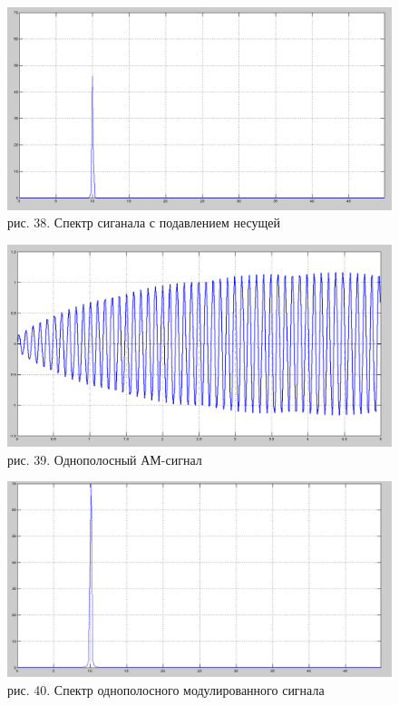 \documentclass[10pt,a4paper]{report}
\begin{document}
\begin{figure}
\begin{center}
\includegraphics[width=150mm, scale = 0.9]{7_10.png}\newline
рис. 38. Спектр сиганала с подавлением несущей \newline
\end{center}
\end{figure}
\begin{figure}
\begin{center}
\includegraphics[width=150mm, scale = 0.9]{7_11.png}\newline
рис. 39. Однополосный АМ-сигнал\newline
\end{center}
\end{figure}
\begin{figure}
\begin{center}
\includegraphics[width=150mm, scale = 0.9]{7_12.png}\newline
рис. 40. Спектр однополосного модулированного сигнала\newline
\end{center}
\end{figure}
\end{document}
